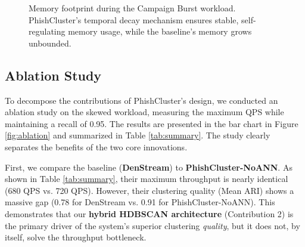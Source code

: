 \documentclass[journal,article,submit,pdftex,moreauthors]{Definitions/mdpi}
\begin{document}
\begin{figure}[h!]
\centering
{}
\caption{Memory footprint during the Campaign Burst workload. PhishCluster's temporal decay mechanism ensures stable, self-regulating memory usage, while the baseline's memory grows unbounded.}
\label{fig:memory_stability}
\end{figure}


\subsection{Ablation Study}

To decompose the contributions of PhishCluster's design, we conducted an ablation study on the skewed workload, measuring the maximum QPS while maintaining a recall of 0.95. The results are presented in the bar chart in Figure \ref{fig:ablation} and summarized in Table \ref{tab:summary}. The study clearly separates the benefits of the two core innovations.

First, we compare the baseline (\textbf{DenStream}) to \textbf{PhishCluster-NoANN}. As shown in Table \ref{tab:summary}, their maximum throughput is nearly identical (680 QPS vs. 720 QPS). However, their clustering quality (Mean ARI) shows a massive gap (0.78 for DenStream vs. 0.91 for PhishCluster-NoANN). This demonstrates that our \textbf{hybrid HDBSCAN architecture} (Contribution 2) is the primary driver of the system's superior clustering \textit{quality}, but it does not, by itself, solve the throughput bottleneck.
\end{document}
